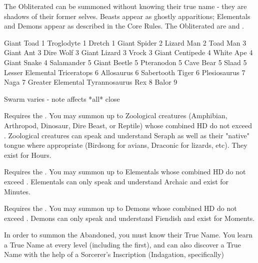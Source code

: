 {

The Obliterated can be summoned without knowing their true name - they are shadows of their former selves.  Beasts appear as ghostly apparitions; Elementals and Demons appear as described in the Core Rules.  The Obliterated are  and .




Giant Toad 1 
Troglodyte 1
Dretch 1
Giant Spider 2
Lizard Man 2
Toad Man 3 
Giant Ant 3
Dire Wolf 3
Giant Lizard 3
Vrock 3
Giant Centipede 4
White Ape 4
Giant Snake 4
Salamander 5 
Giant Beetle 5
Pteranodon 5
Cave Bear 5
Slaad 5
Lesser Elemental
Triceratops 6
Allosaurus 6 
Sabertooth Tiger 6
Plesiosaurus 7
Naga 7
Greater Elemental
Tyrannosaurus Rex 8
Balor 9






Swarm varies - note affects *all* close





Requires the . You may summon up to \DICE Zoological creatures (Amphibian, Arthropod, Dinosaur, Dire Beast, or Reptile) whose combined HD do not exceed \DICE.  Zoological creatures can speak and understand Seraph as well as their "native" tongue where appropriate (Birdsong for avians, Draconic for lizards, etc).  They exist for \SUMDICE Hours. 



Requires the . You may summon up to \DICE Elementals whose combined HD do not exceed \DICE. Elementals can only speak and understand Archaic and exist for \SUMDICE Minutes. 



Requires the . You may summon up to \DICE Demons whose combined HD do not exceed \DICE.  Demons can only speak and understand Fiendish and exist for \SUMDICE Moments.





In order to summon the Abandoned, you must know their True Name.  You learn a True Name at every level (including the first), and can also discover a True Name with the help of a Sorcerer's Inscription (Indagation, specifically)

}
